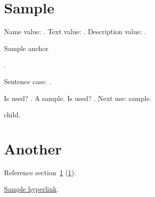 \documentclass{article}
\begin{document}
\tableofcontents

\section{Sample}
\label{sec:sample}
Name value: .
Text value: .
Description value: .

\hypertarget{sampleanchor}{Sample anchor}.

Sentence case: .

Is used? .
A \gls{sample}.
Is used? .
Next use: \gls{sample}.

\Gls{child}.

\section{Another}
\label{sec:another}

Reference section~\ref{sec:sample} (\ref*{sec:sample}).

\hyperlink{sampleanchor}{Sample hyperlink}.


\begin{theglossary}
%
%
\end{theglossary}
\end{document}
